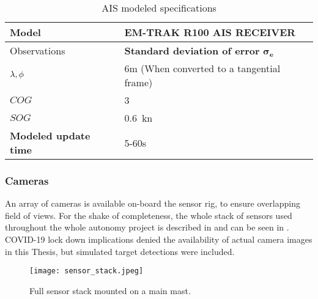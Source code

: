 \begin{table}[H]
	\centering
	\caption{AIS modeled specifications}
	\label{tab:AIS_specs}
	\begin{tabular}{ll}
		\hline
		\textbf{Model} &  EM-TRAK R100 AIS RECEIVER \T \\ \hline
		Observations&\textbf{Standard deviation of error} $\mathbf{\sigma_e}$   \T \\ \hline
		${{\lambda} ,{\phi}}$ & 6m (When converted to a tangential frame) \\
		${COG}$ & \SI{3}{\deg} \\
		${SOG}$ & \SI{0.6}{\knot} \T \\ \hline
		\textbf{Modeled update time} & 5-60s \T \\ \hline
	\end{tabular}
\end{table}

\subsubsection{Cameras}

An array of cameras is available on-board the sensor rig, to ensure overlapping field of views. For the shake of completeness, the whole stack of sensors used throughout the whole autonomy project is described in  and can be seen in . COVID-19 lock down implications denied the availability of actual camera images in this Thesis, but simulated target detections were included.


\begin{figure}[H]
	\centering
	\texttt{[image: sensor\_stack.jpeg]}
	\caption{Full sensor stack mounted on a main mast.}
	\label{fig:stack}
\end{figure}

\begin{table}[H]
	\centering
	\caption{Sensor stack on the mast illustrated in .}
	\label{tab:stack}
\end{table}

